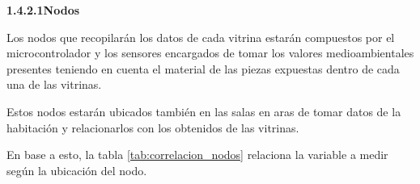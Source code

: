     \textbf{1.4.2.1\hspace{5mm}Nodos}

    Los nodos que recopilarán los datos de cada vitrina estarán compuestos por el microcontrolador y los sensores encargados de tomar los valores medioambientales presentes teniendo en cuenta el material de las piezas expuestas dentro de cada una de las vitrinas.
    
    Estos nodos estarán ubicados también en las salas en aras de tomar datos de la habitación y relacionarlos con los obtenidos de las vitrinas.

    En base a esto, la tabla \ref{tab:correlacion_nodos} relaciona la variable a medir según la ubicación del nodo.

